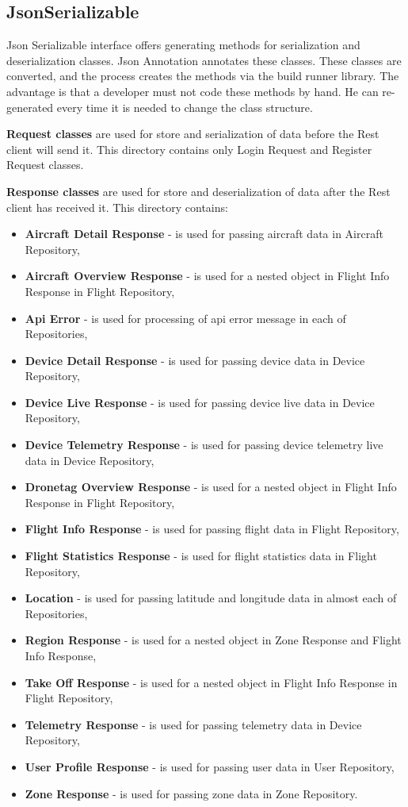 \subsection{JsonSerializable}\label{subsec:jsonserializable-classes}
Json Serializable interface offers generating methods for serialization and deserialization classes.
Json Annotation annotates these classes.
These classes are converted, and the process creates the methods via the build runner library.
The advantage is that a developer must not code these methods by hand.
He can re-generated every time it is needed to change the class structure.

\textbf{Request classes} are used for store and serialization of data before the Rest client will send it.
This directory contains only Login Request and Register Request classes.

\textbf{Response classes} are used for store and deserialization of data after the Rest client has received it.
This directory contains:
\begin{itemize}
    \item \textbf{Aircraft Detail Response} - is used for passing aircraft data in Aircraft Repository,
    \item \textbf{Aircraft Overview Response} - is used for a nested object in Flight Info Response in Flight Repository,
    \item \textbf{Api Error} - is used for processing of \acrshort{api} error message in each of Repositories,
    \item \textbf{Device Detail Response} - is used for passing device data in Device Repository,
    \item \textbf{Device Live Response} - is used for passing device live data in Device Repository,
    \item \textbf{Device Telemetry Response} - is used for passing device telemetry live data in Device Repository,
    \item \textbf{Dronetag Overview Response} - is used for a nested object in Flight Info Response in Flight Repository,
    \item \textbf{Flight Info Response} - is used for passing flight data in Flight Repository,
    \item \textbf{Flight Statistics Response} - is used for flight statistics data in Flight Repository,
    \item \textbf{Location} - is used for passing latitude and longitude data in almost each of Repositories,
    \item \textbf{Region Response} - is used for a nested object in Zone Response and Flight Info Response,
    \item \textbf{Take Off Response} - is used for a nested object in Flight Info Response in Flight Repository,
    \item \textbf{Telemetry Response} - is used for passing telemetry data in Device Repository,
    \item \textbf{User Profile Response} - is used for passing user data in User Repository,
    \item \textbf{Zone Response} - is used for passing zone data in Zone Repository.
\end{itemize}
